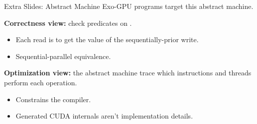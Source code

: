 \documentclass[aspectratio=169]{beamer}
\begin{document}
\begin{frame}[label=extra_machine]{Extra Slides: Abstract Machine}
Exo-GPU programs target this abstract machine.
\medskip

\textbf{Correctness view:} check predicates on .
\begin{itemize}
  \item Each read is  to get the value of the sequentially-prior write.
  \item Sequential-parallel equivalence.
\end{itemize}
\medskip

\textbf{Optimization view:} the abstract machine trace  which instructions and threads perform each operation.
\begin{itemize}
  \item Constrains the compiler.
  \item Generated CUDA internals aren't implementation details.
\end{itemize}
\end{frame}
\end{document}
